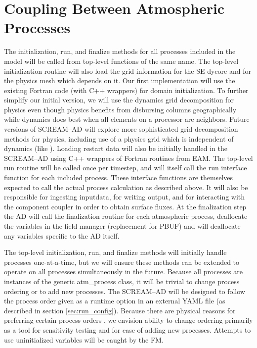 \documentclass[10pt]{article}
\begin{document}
\section{Coupling Between Atmospheric Processes}
\label{sec:proc_cpl}

The initialization, run, and finalize methods for all processes included in the model will be called from top-level functions of the same name. The top-level initialization routine will also load the grid information for the SE dycore and for the physics mesh which depends on it. Our first implementation will use the existing Fortran code (with C++ wrappers) for domain initialization. To further simplify our initial version, we will use the dynamics grid decomposition for physics even though physics benefits from disbursing columns geographically while dynamics does best when all elements on a processor are neighbors. Future versions of SCREAM--AD will explore more sophisticated grid decomposition methods for physics, including use of a physics grid which is independent of dynamics (like \cite{herrington_physgrid}). Loading restart data will also be initially handled in the SCREAM--AD using C++ wrappers of Fortran routines from EAM. The top-level run routine will be called once per timestep, and will itself call the run interface function for each included process. These interface functions are themselves expected to call the actual process calculation as described above. It will also be responsible for ingesting inputdata, for writing output, and for interacting with the component coupler in order to obtain surface fluxes. At the finalization step the AD will call the finalization routine for each atmospheric process, deallocate the variables in the field manager (replacement for PBUF) and will deallocate any variables specific to the AD itself.

The top-level initialization, run, and finalize methods will initially handle processes one-at-a-time, but we will ensure these methods can be extended to operate on all processes simultaneously in the future. Because all processes are instances of the generic atm\_process class, it will be trivial to change process ordering or to add new processes. The SCREAM--AD will be designed to follow the process order given as a runtime option in an external YAML file (as described in section \ref{sec:run_config}). Because there are physical reasons for preferring certain process orders \cite{Donahue_param_order}, we envision ability to change ordering primarily as a tool for sensitivity testing and for ease of adding new processes. Attempts to use uninitialized variables will be caught by the FM.
\end{document}

